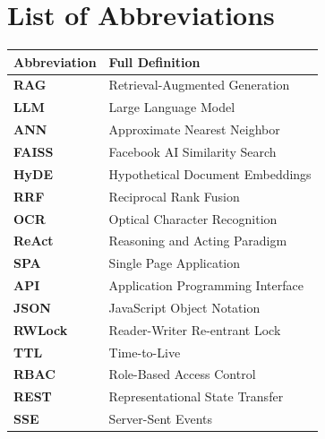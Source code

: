 \documentclass[12pt,a4paper,oneside]{report}
\begin{document}
\tableofcontents
\newpage

\listoffigures
\newpage

\listoftables
\newpage

\chapter*{List of Abbreviations}
\thispagestyle{plain}

\begin{table}[H]
\centering
{}
\begin{tabularx}{\textwidth}{lX}
\toprule
\textbf{Abbreviation} & \textbf{Full Definition} \\
\midrule
\textbf{RAG} & Retrieval-Augmented Generation \\
\textbf{LLM} & Large Language Model \\
\textbf{ANN} & Approximate Nearest Neighbor \\
\textbf{FAISS} & Facebook AI Similarity Search \\
\textbf{HyDE} & Hypothetical Document Embeddings \\
\textbf{RRF} & Reciprocal Rank Fusion \\
\textbf{OCR} & Optical Character Recognition \\
\textbf{ReAct} & Reasoning and Acting Paradigm \\
\textbf{SPA} & Single Page Application \\
\textbf{API} & Application Programming Interface \\
\textbf{JSON} & JavaScript Object Notation \\
\textbf{RWLock} & Reader-Writer Re-entrant Lock \\
\textbf{TTL} & Time-to-Live \\
\textbf{RBAC} & Role-Based Access Control \\
\textbf{REST} & Representational State Transfer \\
\textbf{SSE} & Server-Sent Events \\
\bottomrule
\end{tabularx}
\end{table}

\newpage

\setcounter{page}{1}
\end{document}
